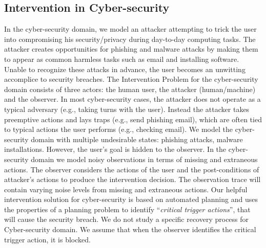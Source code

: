 \subsection{Intervention in Cyber-security}
In the cyber-security domain, we model an attacker attempting to trick the user into compromising his security/privacy during day-to-day computing tasks.
The attacker creates opportunities for phishing and malware attacks by making them to appear as common harmless tasks such as email and installing software.
Unable to recognize these attacks in advance, the user becomes an unwitting accomplice to security breaches. 
The Intervention Problem for the cyber-security domain consists of three actors: the human user, the attacker (human/machine) and the observer. 
In most cyber-security cases, the attacker does not operate as a typical adversary (e.g., taking turns with the user). 
Instead the attacker takes preemptive actions and lays traps (e.g., send phishing email), which are often tied to typical actions the user performs (e.g., checking email). 
We model the cyber-security domain with multiple undesirable states: phishing attacks, malware installations. However, the user's goal is hidden to the observer.
In the cyber-security domain we model noisy observations in terms of missing and extraneous actions.
The observer considers the actions of the user and the post-conditions of attacker's actions to produce the intervention decision. 
The observation trace will contain varying noise levels from missing and extraneous actions.
Our helpful intervention solution for cyber-security is based on automated planning and uses the properties of a planning problem to identify ``\textit{critical trigger actions}'', that will cause the security breach. 
We do not study a specific recovery process for Cyber-security domain. 
We assume that when the observer identifies the critical trigger action, it is blocked.

